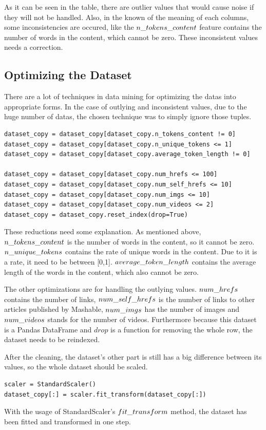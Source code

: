 \noindent As it can be seen in the table, there are outlier values that would cause noise if they will not be handled. Also, in the known of the meaning of each columns, some inconsistencies are occured, like the $n\char`_tokens\char`_content$ feature contains the number of words in the content, which cannot be zero. These inconsistent values needs a correction.


\subsection{Optimizing the Dataset}

There are a lot of techniques in data mining for optimizing the datas into appropriate forms. In the case of outlying and inconsistent values, due to the huge number of datas, the chosen technique was to simply ignore those tuples. 
\begin{lstlisting}
dataset_copy = dataset_copy[dataset_copy.n_tokens_content != 0]
dataset_copy = dataset_copy[dataset_copy.n_unique_tokens <= 1]
dataset_copy = dataset_copy[dataset_copy.average_token_length != 0]

dataset_copy = dataset_copy[dataset_copy.num_hrefs <= 100]
dataset_copy = dataset_copy[dataset_copy.num_self_hrefs <= 10]
dataset_copy = dataset_copy[dataset_copy.num_imgs <= 10]
dataset_copy = dataset_copy[dataset_copy.num_videos <= 2]
dataset_copy = dataset_copy.reset_index(drop=True)
\end{lstlisting}

These reductions need some explanation. As mentioned above, $n\char`_tokens\char`_content$ is the number of words in the content, so it cannot be zero. $n\char`_unique\char`_tokens$ contains the rate of unique words in the content. Due to it is a rate, it need to be between [0,1]. $average\char`_token\char`_length$ contains the average length of the words in the content, which also cannot be zero. \smallskip

The other optimizations are for handling the outlying values. $num\char`_hrefs$ contains the number of links, $num\char`_self\char`_hrefs$ is the number of links to other articles published by Mashable, $num\char`_imgs$ has the number of images and $num\char`_videos$ stands for the number of videos. Furthermore because this dataset is a Pandas DataFrame and $drop$ is a function for removing the whole row, the dataset needs to be reindexed.\medskip

After the cleaning, the dataset's other part is still has a big difference between its values, so the whole dataset should be scaled. 
\begin{lstlisting}
scaler = StandardScaler()
dataset_copy[:] = scaler.fit_transform(dataset_copy[:])
\end{lstlisting}
With the usage of StandardScaler's $fit\char`_transform$ method, the dataset has been fitted and transformed in one step. \medskip


